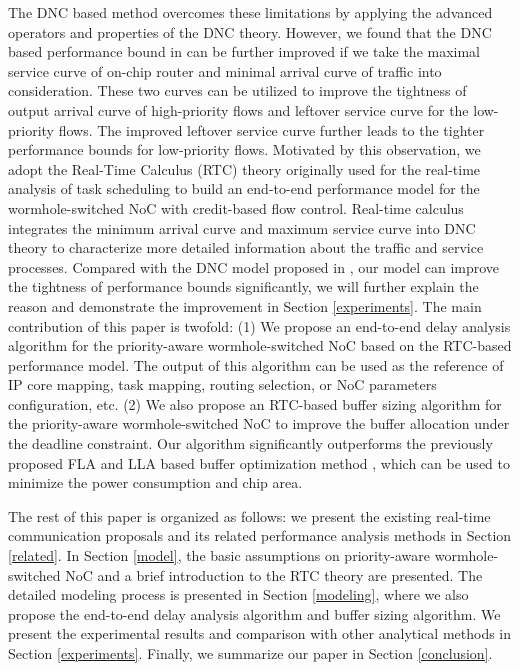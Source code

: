 \documentclass[10pt,journal]{IEEEtran}
\begin{document}
The DNC based method \cite{Qian489900} overcomes these limitations by applying the advanced operators and properties of the DNC theory. However, we found that the DNC based performance bound in \cite{Qian489900} can be further improved if we take the maximal service curve of on-chip router and minimal arrival curve of traffic into consideration. These two curves can be utilized to improve the tightness of output arrival curve of high-priority flows and leftover service curve for the low-priority flows. The improved leftover service curve further leads to the tighter performance bounds for low-priority flows. Motivated by this observation, we adopt the Real-Time Calculus (RTC) theory \cite{1253607} originally used for the real-time analysis of task scheduling to build an end-to-end performance model for the wormhole-switched NoC with credit-based flow control. Real-time calculus integrates the minimum arrival curve and maximum service curve into DNC theory to characterize more detailed information about the traffic and service processes. Compared with the DNC model proposed in \cite{Qian489900}, our model can improve the tightness of performance bounds significantly, we will further explain the reason and demonstrate the improvement in Section \ref{experiments}. The main contribution of this paper is twofold: (1) We propose an end-to-end delay analysis algorithm for the priority-aware wormhole-switched NoC based on the RTC-based performance model. The output of this algorithm can be used as the reference of IP core mapping, task mapping, routing selection, or NoC parameters configuration, etc. (2) We also propose an RTC-based buffer sizing algorithm for the priority-aware wormhole-switched NoC to improve the buffer allocation under the deadline constraint. Our algorithm significantly outperforms the previously proposed FLA and LLA based buffer optimization method \cite{189}, which can be used to minimize the power consumption and chip area.

The rest of this paper is organized as follows: we present the existing real-time communication proposals and its related performance analysis methods in Section \ref{related}. In Section \ref{model}, the basic assumptions on priority-aware wormhole-switched NoC and a brief introduction to the RTC theory are presented. The detailed modeling process is presented in Section \ref{modeling}, where we also propose the end-to-end delay analysis algorithm and buffer sizing algorithm. We present the experimental results and comparison with other analytical methods in Section \ref{experiments}. Finally, we summarize our paper in Section \ref{conclusion}.
\end{document}
